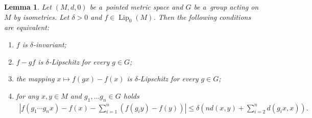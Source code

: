 \documentclass[11pt,a4paper]{amsart}
\newtheorem{lemma}[theorem]{Lemma}
\theoremstyle{definition}
\newcommand{\abs}[1]{\left| #1 \right|}
\newcommand{\Lipz}{\operatorname{Lip}_0}
\begin{document}
	\begin{lemma} \label{lma:LipDeltaInv}
		Let $(M, d, 0)$ be a~pointed metric space and $G$ be a~group acting on $M$ by isometries. Let $\delta > 0$ and $f \in \Lipz(M)$. Then the following conditions are equivalent:
		\begin{enumerate}
			\item $f$ is $\delta$-invariant;
			\item $f - gf$ is $\delta$-Lipschitz for every $g \in G$;
			\item the mapping $x \mapsto f(gx) - f(x)$ is $\delta$-Lipschitz for every $g \in G$;
			\item for any $x, y \in M$ and $g_1, \dots g_n \in G$ holds
			\begin{align*}
				\abs{f(g_1 \cdots g_n x) - f(x) - \sum_{i=1}^{n} (f(g_iy) - f(y))}
				\leq \delta \left(nd(x,y) + \sum_{i=2}^{n} d(g_ix, x)\right).
			\end{align*}
		\end{enumerate}
	\end{lemma}
\end{document}
